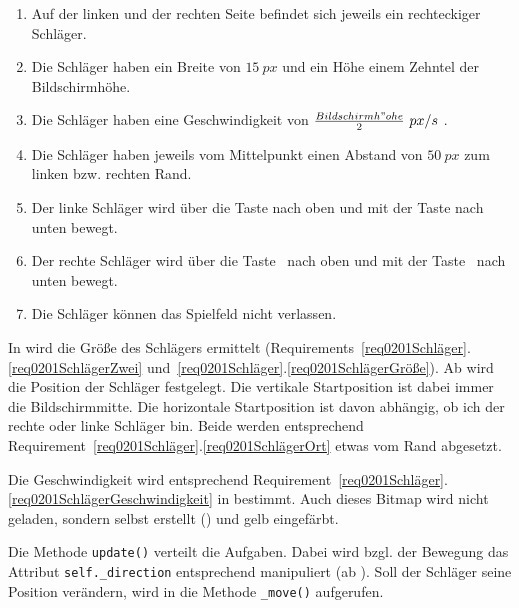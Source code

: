 \begin{enumerate}
	\item Auf der linken und der rechten Seite befindet sich jeweils ein rechteckiger Schläger.\label{req0201SchlägerZwei}
	\item Die Schläger haben ein Breite von $15~px$ und ein Höhe einem Zehntel der Bildschirmhöhe.\label{req0201SchlägerGröße}
	\item Die Schläger haben eine Geschwindigkeit von $\frac{Bildschirmh"ohe}{2}~px/s$ .\label{req0201SchlägerGeschwindigkeit}
	\item Die Schläger haben jeweils vom Mittelpunkt einen Abstand von $50~px$ zum linken bzw. rechten Rand.\label{req0201SchlägerOrt}
	\item Der linke Schläger wird über die Taste  nach oben und mit der Taste  nach unten bewegt.\label{req0201SchlägerTastenLinks}
	\item Der rechte Schläger wird über die Taste \UArrow\ nach oben und mit der Taste \DArrow\ nach unten bewegt.\label{req0201SchlägerTastenRechts}
	\item Die Schläger können das Spielfeld nicht verlassen.\label{req0201SchlägerGefangen}
\end{enumerate}
\er

In  wird die Größe des Schlägers ermittelt (Requirements~\ref{req0201Schläger}.\ref{req0201SchlägerZwei} und~\ref{req0201Schläger}.\ref{req0201SchlägerGröße}). Ab  wird die Position der Schläger festgelegt. Die vertikale Startposition ist dabei immer die Bildschirmmitte. Die horizontale Startposition ist davon abhängig, ob ich der rechte oder linke Schläger bin. Beide werden entsprechend Requirement~\ref{req0201Schläger}.\ref{req0201SchlägerOrt} etwas vom Rand abgesetzt. 

Die Geschwindigkeit wird entsprechend Requirement~\ref{req0201Schläger}.\ref{req0201SchlägerGeschwindigkeit} in  bestimmt. Auch dieses Bitmap wird nicht geladen, sondern selbst erstellt () und gelb eingefärbt.


Die Methode \texttt{update()} verteilt die Aufgaben. Dabei wird bzgl. der Bewegung das Attribut \texttt{self.\_direction} entsprechend manipuliert (ab ). Soll der Schläger seine Position verändern, wird in  die Methode \texttt{\_move()} aufgerufen.


